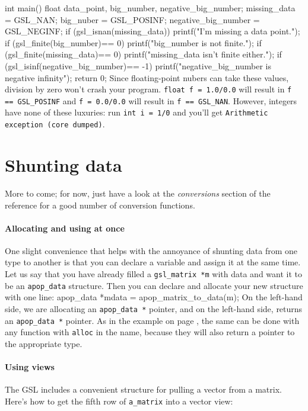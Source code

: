 int main(){
float data_point, big_number, negative_big_number;
missing_data = GSL_NAN;
big_nuber = GSL_POSINF;
negative_big_number = GSL_NEGINF;
if (gsl_isnan(missing_data))
    printf("I'm missing a data point.");
if (gsl_finite(big_number)== 0)
    printf("big_number is not finite.");
if (gsl_finite(missing_data)== 0)
    printf("missing_data isn't finite either.");
if (gsl_isinf(negative_big_number)== -1)
    printf("negative_big_number is negative infinity");
return 0;
}
Since floating-point nubers can take these values, division by zero
won't crash your program. {\tt float f = 1.0/0.0} will result in
{\tt f == GSL\_POSINF} and {\tt f = 0.0/0.0} will result in {\tt f ==
GSL\_NAN}. However, integers have none of these luxuries: run {\tt int
i = 1/0} and you'll get {\tt Arithmetic exception (core dumped)}.


\section{Shunting data} \label{asst_conversions}  

More to come; for now, just have a look at the {\sl conversions} section
of the reference for a good number of conversion functions.

\paragraph{Allocating and using at once}    
One slight convenience that helps with the annoyance of shunting data from
one type to another is that you can declare a variable and assign it at the
same time. Let us say that you have already filled a {\tt gsl\_\-matrix
*m} with data and want it to be an {\tt apop\_\-data} structure. Then
you can declare and allocate your new structure with one line:
apop_data   *mdata  = apop_matrix_to_data(m);
On the left-hand side, we are allocating an {\tt apop\_\-data *} pointer, and
on the left-hand side,  returns an 
{\tt apop\_\-data *} pointer. As in the example on page \pageref{gslexample}, the same can be
done with any function with {\tt alloc} in the name, because they will also
return a pointer to the appropriate type.

\paragraph{Using views}
The GSL includes a convenient structure for pulling a vector from a
matrix. Here's how to get the fifth row of {\tt a\_matrix} into a vector view:

